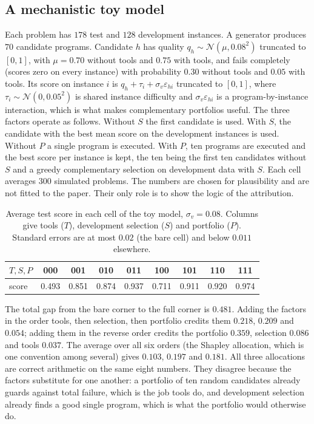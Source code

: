 \documentclass[11pt]{article}
\theoremstyle{definition}
\begin{document}
\subsection*{A mechanistic toy model}

Each problem has $178$ test and $128$ development instances. A generator produces $70$ candidate programs. Candidate $h$ has quality $q_h\sim\mathcal N(\mu,0.08^2)$ truncated to $[0,1]$, with $\mu=0.70$ without tools and $0.75$ with tools, and fails completely (scores zero on every instance) with probability $0.30$ without tools and $0.05$ with tools. Its score on instance $i$ is $q_h+\tau_i+\sigma_v\varepsilon_{hi}$ truncated to $[0,1]$, where $\tau_i\sim\mathcal N(0,0.05^2)$ is shared instance difficulty and $\sigma_v\varepsilon_{hi}$ is a program-by-instance interaction, which is what makes complementary portfolios useful. The three factors operate as follows. Without $S$ the first candidate is used. With $S$, the candidate with the best mean score on the development instances is used. Without $P$ a single program is executed. With $P$, ten programs are executed and the best score per instance is kept, the ten being the first ten candidates without $S$ and a greedy complementary selection on development data with $S$. Each cell averages $300$ simulated problems. The numbers are chosen for plausibility and are not fitted to the paper. Their only role is to show the logic of the attribution.

\begin{table}[h]
\centering
\caption{Average test score in each cell of the toy model, $\sigma_v=0.08$. Columns give tools ($T$), development selection ($S$) and portfolio ($P$). Standard errors are at most $0.02$ (the bare cell) and below $0.011$ elsewhere.}
\label{tab:cells}
\small
\begin{tabular}{lcccccccc}
\toprule
$T,S,P$ & 000 & 001 & 010 & 011 & 100 & 101 & 110 & 111 \\
\midrule
score & 0.493 & 0.851 & 0.874 & 0.937 & 0.711 & 0.911 & 0.920 & 0.974 \\
\bottomrule
\end{tabular}
\end{table}

The total gap from the bare corner to the full corner is $0.481$. Adding the factors in the order tools, then selection, then portfolio credits them $0.218$, $0.209$ and $0.054$; adding them in the reverse order credits the portfolio $0.359$, selection $0.086$ and tools $0.037$. The average over all six orders (the Shapley allocation, which is one convention among several) gives $0.103$, $0.197$ and $0.181$. All three allocations are correct arithmetic on the same eight numbers. They disagree because the factors substitute for one another: a portfolio of ten random candidates already guards against total failure, which is the job tools do, and development selection already finds a good single program, which is what the portfolio would otherwise do.
\end{document}
